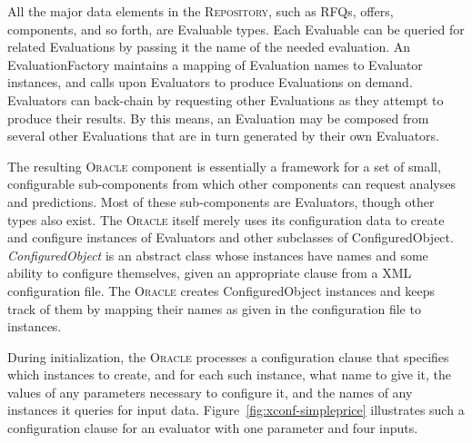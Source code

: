 \documentclass{article}
\begin{document}
All the major data elements in the \textsc{Repository}, such as RFQs, offers, components, and so forth, are Evaluable types.  Each Evaluable can be queried for related Evaluations by passing it the name of the needed evaluation.  An EvaluationFactory maintains a mapping of Evaluation names to Evaluator instances, and calls upon Evaluators to produce Evaluations on demand.  Evaluators can back-chain by requesting other Evaluations as they attempt to produce their results.  By this means, an Evaluation may be composed from several other Evaluations that are in turn generated by their own Evaluators.

The resulting \textsc{Oracle} component is essentially a framework for a set of small, configurable sub-components from which other components can request analyses and predictions.  Most of these sub-components are Evaluators, though other types also exist.  The \textsc{Oracle} itself merely uses its configuration data to create and configure instances of Evaluators and other subclasses of ConfiguredObject.  \emph{ConfiguredObject} is an abstract class whose instances have names and some ability to configure themselves, given an appropriate clause from a XML configuration file.  The \textsc{Oracle} creates ConfiguredObject instances and keeps track of them by mapping their names as given in the configuration file to instances.


During initialization, the \textsc{Oracle} processes a configuration clause that specifies which instances to create, and for each such instance, what name to give it, the values of any parameters necessary to configure it, and the names of any instances it queries for input data.  Figure~\ref{fig:xconf-simpleprice} illustrates such a configuration clause for an evaluator with one parameter and four inputs.
\end{document}
